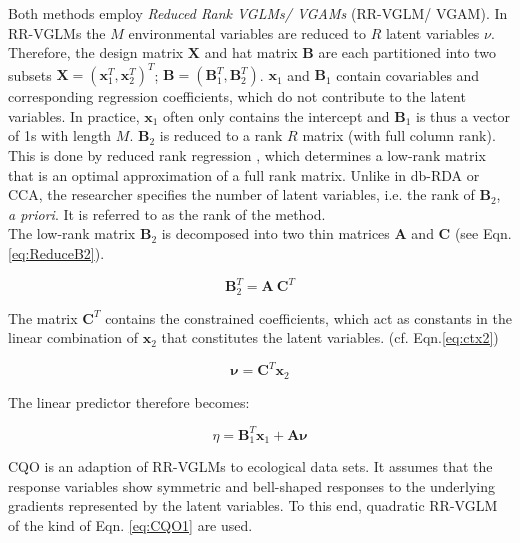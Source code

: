 		Both methods employ \textit{Reduced Rank VGLMs/ VGAMs} (RR-VGLM/ VGAM). 
		In RR-VGLMs the $M$ environmental variables are reduced to $R$ latent variables $\nu$. 
		Therefore, the design matrix $\mathbf{X}$ and hat matrix $\mathbf{B}$ are each partitioned into two subsets 
		$\mathbf{X} = (\mathbf{x}_1^T,\mathbf{x}_2^T)^T$; $\mathbf{B} = (\mathbf{B}_1^T,\mathbf{B}_2^T)$. 
		$\mathbf{x}_1$ and $\mathbf{B}_1$ contain covariables and corresponding regression coefficients, which do not contribute to the latent variables. 
		In practice, $\mathbf{x}_1$ often only contains the intercept and $\mathbf{B}_1$ is thus a vector of 1s with length $M$. $\mathbf{B}_2$ is reduced to a rank $R$ matrix (with full column rank). 
		This is done by reduced rank regression \citep{Anderson1951, izenman1975reduced}, which determines a low-rank matrix that is an optimal
		approximation of a full rank matrix. 
		Unlike in db-RDA or CCA, the researcher specifies the number of latent variables, i.e. the rank of $\mathbf{B}_2$, \textit{a priori}.
		It is referred to as the rank of the method. \\
		The low-rank matrix $\mathbf{B}_2$ is decomposed into two thin matrices $\mathbf{A}$ and $\mathbf{C}$ (see Eqn. \ref{eq:ReduceB2}).
		
		\begin{equation}\label{eq:ReduceB2}
		\mathbf{B}_2^T = \mathbf{A}\ \mathbf{C}^T	
		\end{equation}
		
		The matrix $\mathbf{C}^T$ contains the constrained coefficients, which act as constants in the linear combination of $\mathbf{x}_2$ that constitutes the latent variables. (cf. Eqn.\ref{eq:ctx2})
		
		\begin{equation}\label{eq:ctx2}
		\mathbf{\nu} = \mathbf{C}^T \mathbf{x}_2	
		\end{equation}
		
		The linear predictor therefore becomes:
		
		\begin{equation}\label{eq:ctx3}
		\eta = \mathbf{B}_1^T \mathbf{x}_1 + \mathbf{A} \mathbf{\nu}	
		\end{equation}
		
		
		CQO is an adaption of RR-VGLMs to ecological data sets.
		It assumes that the response variables show symmetric and bell-shaped responses to the underlying gradients represented by the latent variables.
		To this end, quadratic RR-VGLM of the kind of Eqn. \ref{eq:CQO1} are used.
		
